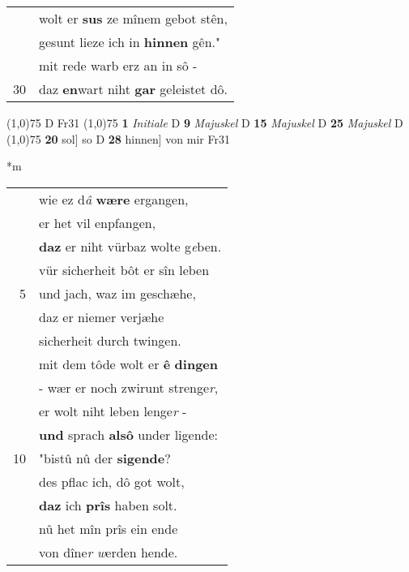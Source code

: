 \documentclass[8pt,a4paper,notitlepage]{article}
\begin{document}
\begin{table}[ht]
\begin{minipage}[t]{0.5\linewidth}
\begin{tabular}{rl}
 & wolt er \textbf{sus} ze mînem gebot stên,\\ 
 & gesunt lieze ich in \textbf{hinnen} gên."\\ 
 & mit rede warb erz an in sô -\\ 
30 & daz \textbf{en}wart niht \textbf{gar} geleistet dô.\\ 
\end{tabular}
\scriptsize
\line(1,0){75} \newline
D Fr31 \newline
\line(1,0){75} \newline
\textbf{1} \textit{Initiale} D  \textbf{9} \textit{Majuskel} D  \textbf{15} \textit{Majuskel} D  \textbf{25} \textit{Majuskel} D  \newline
\line(1,0){75} \newline
\textbf{20} sol] so D \textbf{28} hinnen] von mir Fr31 \newline
\end{minipage}
\hspace{0.5cm}
\begin{minipage}[t]{0.5\linewidth}
\small
\begin{center}*m
\end{center}
\begin{tabular}{rl}
 & wie ez d\textit{â} \textbf{wære} ergangen,\\ 
 & er het vil enpfangen,\\ 
 & \textbf{daz} er niht vürbaz wolte g\textit{e}ben.\\ 
 & vür sicherheit bôt er sîn leben\\ 
5 & und jach, waz im geschæhe,\\ 
 & daz er niemer verjæhe\\ 
 & sicherheit durch twingen.\\ 
 & mit dem tôde wolt er \textbf{ê} \textbf{dingen}\\ 
 & - wær er noch zwirunt strenge\textit{r},\\ 
 & er wolt niht leben lenge\textit{r} -\\ 
 & \textbf{und} sprach \textbf{alsô} under ligende:\\ 
10 & "bistû nû der \textbf{sigende}?\\ 
 & des pflac ich, dô got wolt,\\ 
 & \textbf{daz} ich \textbf{prîs} haben solt.\\ 
 & nû het mîn prîs ein ende\\ 
 & von dîne\textit{r} \textit{w}erden hende.\\ 

\end{tabular}
\end{minipage}
\end{table}
\end{document}
